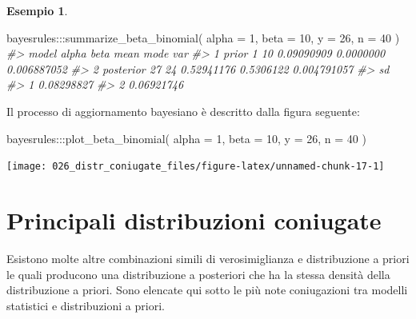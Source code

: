 \documentclass[
  11pt,
  italian,
  a4paper,
  extrafontsizes,onecolumn,openright
  ]{memoir}
\newenvironment{Shaded}{\begin{snugshade}}{\end{snugshade}}
\newcommand{\AttributeTok}[1]{\textcolor[rgb]{0.77,0.63,0.00}{#1}}
\newcommand{\CommentTok}[1]{\textcolor[rgb]{0.56,0.35,0.01}{\textit{#1}}}
\newcommand{\DecValTok}[1]{\textcolor[rgb]{0.00,0.00,0.81}{#1}}
\newcommand{\FunctionTok}[1]{\textcolor[rgb]{0.00,0.00,0.00}{#1}}
\newcommand{\NormalTok}[1]{#1}
\newcommand{\SpecialCharTok}[1]{\textcolor[rgb]{0.00,0.00,0.00}{#1}}
\theoremstyle{definition}
\theoremstyle{definition}
\newtheorem{example}{Esempio}[chapter]
\theoremstyle{definition}
\theoremstyle{definition}
\theoremstyle{remark}
\begin{document}
\begin{example}
\begin{Shaded}
\begin{Highlighting}[]
\NormalTok{bayesrules}\SpecialCharTok{:::}\FunctionTok{summarize\_beta\_binomial}\NormalTok{(}
  \AttributeTok{alpha =} \DecValTok{1}\NormalTok{, }\AttributeTok{beta =} \DecValTok{10}\NormalTok{, }\AttributeTok{y =} \DecValTok{26}\NormalTok{, }\AttributeTok{n =} \DecValTok{40}
\NormalTok{)}
\CommentTok{\#\textgreater{}       model alpha beta       mean      mode         var}
\CommentTok{\#\textgreater{} 1     prior     1   10 0.09090909 0.0000000 0.006887052}
\CommentTok{\#\textgreater{} 2 posterior    27   24 0.52941176 0.5306122 0.004791057}
\CommentTok{\#\textgreater{}           sd}
\CommentTok{\#\textgreater{} 1 0.08298827}
\CommentTok{\#\textgreater{} 2 0.06921746}
\end{Highlighting}
\end{Shaded}

\noindent
Il processo di aggiornamento bayesiano è descritto dalla figura seguente:

\begin{Shaded}
\begin{Highlighting}[]
\NormalTok{bayesrules}\SpecialCharTok{:::}\FunctionTok{plot\_beta\_binomial}\NormalTok{(}
  \AttributeTok{alpha =} \DecValTok{1}\NormalTok{, }\AttributeTok{beta =} \DecValTok{10}\NormalTok{, }\AttributeTok{y =} \DecValTok{26}\NormalTok{, }\AttributeTok{n =} \DecValTok{40}
\NormalTok{)}
\end{Highlighting}
\end{Shaded}

\begin{center}\texttt{[image: 026\_distr\_coniugate\_files/figure-latex/unnamed-chunk-17-1]} \end{center}

\end{example}

\hypertarget{principali-distribuzioni-coniugate}{%
\section{Principali distribuzioni coniugate}\label{principali-distribuzioni-coniugate}}

Esistono molte altre combinazioni simili di verosimiglianza e distribuzione a priori le quali producono una distribuzione a posteriori che ha la stessa densità della distribuzione a priori. Sono elencate qui sotto le più note coniugazioni tra modelli statistici e distribuzioni a priori.
\end{document}
